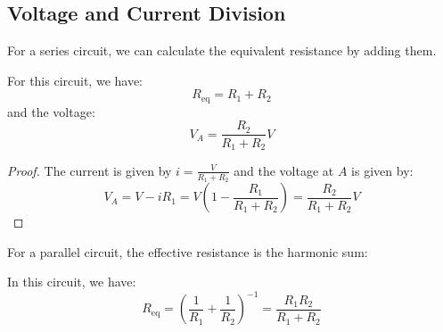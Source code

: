 \documentclass{article}
\begin{document}
    \subsection{Voltage and Current Division}
    For a series circuit, we can calculate the equivalent resistance by adding them.
    \begin{center}
    \end{center}
    For this circuit, we have:
    \begin{equation}
        R_\text{eq} = R_1 + R_2
    \end{equation}
    and the voltage:
    \begin{equation}
        V_A = \frac{R_2}{R_1+R_2}V
    \end{equation}
    \begin{proof}
        The current is given by $i = \frac{V}{R_1+R_2}$ and the voltage at $A$ is given by:
        \begin{equation}
            V_A = V - iR_1 = V\left(1 - \frac{R_1}{R_1+R_2}\right) = \frac{R_2}{R_1+R_2}V
        \end{equation}
    \end{proof}
    For a parallel circuit, the effective resistance is the harmonic sum:
    \begin{center}
    \end{center}
    In this circuit, we have:
    \begin{equation}
        R_\text{eq} = \left(\frac{1}{R_1} + \frac{1}{R_2}\right)^{-1} = \frac{R_1R_2}{R_1+R_2}
    \end{equation}
\end{document}
